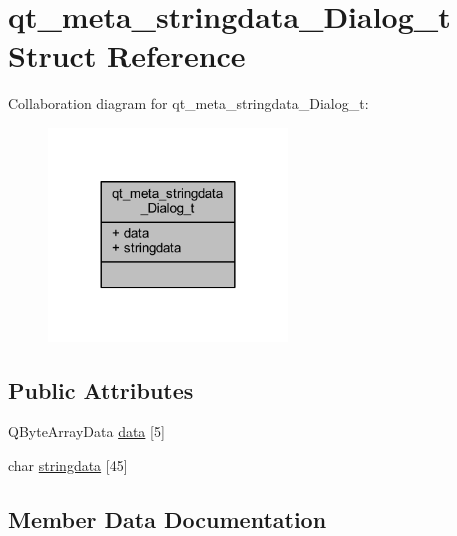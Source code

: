 \hypertarget{structqt__meta__stringdata___dialog__t}{}\section{qt\+\_\+meta\+\_\+stringdata\+\_\+\+Dialog\+\_\+t Struct Reference}
\label{structqt__meta__stringdata___dialog__t}


Collaboration diagram for qt\+\_\+meta\+\_\+stringdata\+\_\+\+Dialog\+\_\+t\+:
\nopagebreak
\begin{figure}[H]
\begin{center}
\leavevmode
\includegraphics[width=180pt]{d1/dca/structqt__meta__stringdata___dialog__t__coll__graph}
\end{center}
\end{figure}
\subsection*{Public Attributes}
\begin{DoxyCompactItemize}
\item 
Q\+Byte\+Array\+Data \hyperlink{structqt__meta__stringdata___dialog__t_ae8df3bc8b623c73ab4d9b75541fe0ed8}{data} \mbox{[}5\mbox{]}
\item 
char \hyperlink{structqt__meta__stringdata___dialog__t_a769f7e87149e8f8b7b590952140417cd}{stringdata} \mbox{[}45\mbox{]}
\end{DoxyCompactItemize}


\subsection{Member Data Documentation}
\hypertarget{structqt__meta__stringdata___dialog__t_ae8df3bc8b623c73ab4d9b75541fe0ed8}{}
